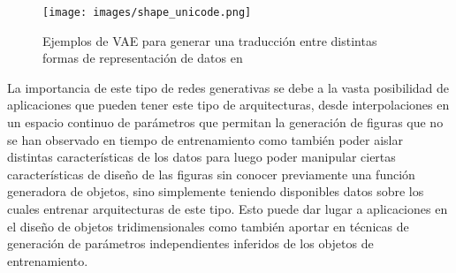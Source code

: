 \documentclass[spanish]{article}
\begin{document}
\begin{figure}[h]
\texttt{[image: images/shape\_unicode.png]}
\centering
\caption{Ejemplos de VAE para generar una traducción entre distintas formas de representación de datos en \cite{Muralikrishnan2019}}
\label{ShapeUnicode}
\end{figure}


La importancia de este tipo de redes generativas se debe a la vasta posibilidad de aplicaciones que pueden tener este tipo de arquitecturas, desde interpolaciones en un espacio continuo de parámetros que permitan la generación de figuras que no se han observado en tiempo de entrenamiento como también poder aislar distintas características de los datos para luego poder manipular ciertas características de diseño de las figuras sin conocer previamente una función generadora de objetos, sino simplemente teniendo disponibles datos sobre los cuales entrenar arquitecturas de este tipo. Esto puede dar lugar a aplicaciones en el diseño de objetos tridimensionales como también aportar en técnicas de generación de parámetros independientes inferidos de los objetos de entrenamiento.
\end{document}
